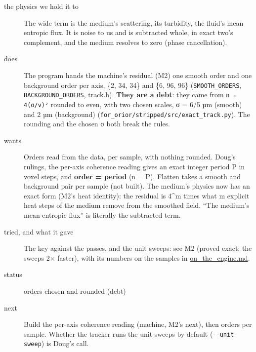 \begin{description}
\item[{the physics we hold it to}] The wide term is the medium's scattering, its turbidity, the fluid's mean entropic flux. It is noise to us and is subtracted whole, in exact two's complement, and the medium resolves to zero (phase cancellation).
\item[{does}] The program hands the machine's residual (M2) one smooth order and one background order per axis, \{2, 34, 34\} and \{6, 96, 96\} (\texttt{SMOOTH\_\allowbreak{}ORDERS}, \texttt{BACKGROUND\_\allowbreak{}ORDERS}, track.h). \textbf{They are a debt}: they came from \texttt{n = 4(σ/\allowbreak{}v)²} rounded to even, with two chosen scales, σ = 6/5 µm (smooth) and 2 µm (background) (\texttt{for\_\allowbreak{}orior/\allowbreak{}stripped/\allowbreak{}src/\allowbreak{}exact\_\allowbreak{}track.\allowbreak{}py}). The rounding and the chosen σ both break the rules.
\item[{wants}] Orders read from the data, per sample, with nothing rounded. Doug's rulings, the per-axis coherence reading gives an exact integer period P in voxel steps, and \textbf{order = period} (n = P). Flatten takes a smooth and background pair per sample (not built). The medium's physics now has an exact form (M2's heat identity): the residual is 4\textasciicircum{}m times what m explicit heat steps of the medium remove from the smoothed field. “The medium's mean entropic flux” is literally the subtracted term.
\item[{tried, and what it gave}] The key against the passes, and the unit sweeps: see M2 (proved exact; the sweeps 2× faster), with its numbers on the samples in \hyperref[chap:on-the-engine]{on\_\allowbreak{}the\_\allowbreak{}engine.md}.
\item[{status}] orders chosen and rounded (debt)
\item[{next}] Build the per-axis coherence reading (machine, M2's next), then orders per sample. Whether the tracker runs the unit sweeps by default (\texttt{-\allowbreak{}-\allowbreak{}unit-\allowbreak{}sweep}) is Doug's call.
\end{description}

